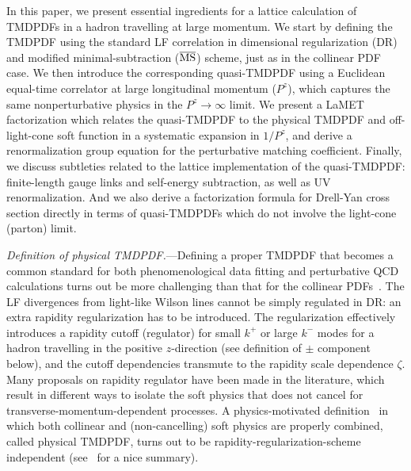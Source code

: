 \documentclass[twocolumn,aps,prd,preprintnumbers,superscriptaddress,10pt]{revtex4-1}
\begin{document}
In this paper, we present essential ingredients for a lattice calculation of TMDPDFs in
a hadron travelling at large momentum.
%
We start by defining the TMDPDF using the standard LF correlation in dimensional regularization (DR)
and modified minimal-subtraction ($\overline{\rm MS}$) scheme, just as in the collinear
PDF case.
%
We then introduce the corresponding quasi-TMDPDF using a Euclidean equal-time correlator
at large longitudinal momentum ($P^z$), which captures the same nonperturbative physics
in the $P^z\to \infty$ limit.
%
We present a LaMET factorization which relates the quasi-TMDPDF
to the physical TMDPDF and off-light-cone soft function in a systematic expansion in $1/P^z$, and derive
a renormalization group equation for the perturbative matching coefficient.
%
Finally, we discuss subtleties related to the lattice implementation of the quasi-TMDPDF:
finite-length gauge links and self-energy subtraction, as well as UV renormalization.
%
And we also derive a factorization formula for Drell-Yan cross section directly
in terms of quasi-TMDPDFs which do not involve the light-cone (parton) limit.

\vspace{0.2cm}

{\it Definition of physical TMDPDF.}---Defining a proper TMDPDF that becomes a common standard for both phenomenological data fitting and perturbative QCD calculations turns out be more challenging than that for the collinear PDFs~\cite{Collins:2011zzd}.
%
The LF divergences from light-like Wilson lines cannot be simply regulated in DR: an extra rapidity
regularization has to be introduced.
The regularization effectively introduces a rapidity cutoff (regulator) for small $k^+$ or large $k^-$ modes
for a hadron travelling in the positive $z$-direction (see definition of $\pm$ component below), and the cutoff dependencies transmute to the rapidity scale dependence $\zeta$.
Many proposals on rapidity regulator have been made in the literature, which result in different ways to isolate the soft physics that does
not cancel for transverse-momentum-dependent processes.
%
A physics-motivated definition~\cite{Collins:2011ca,Echevarria:2012js,Collins:2012uy} in which
both collinear and (non-cancelling) soft physics are properly combined, called physical TMDPDF, turns out to be
rapidity-regularization-scheme independent (see~\cite{Ebert:2019okf} for a nice summary).
\end{document}
